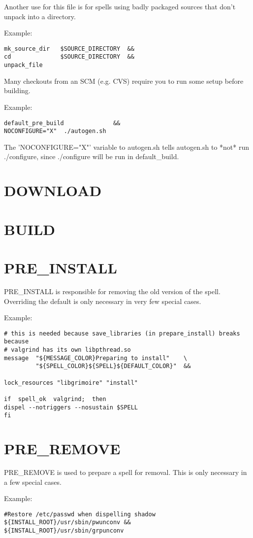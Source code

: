 \documentclass[a4paper,10pt]{book}
\begin{document}
Another use for this file is for spells using badly packaged sources that don't
unpack into a directory.

Example:
\begin{verbatim}
mk_source_dir   $SOURCE_DIRECTORY  &&
cd              $SOURCE_DIRECTORY  &&
unpack_file
\end{verbatim}

Many checkouts from an SCM (e.g. CVS) require you to run some setup before
building.

Example:
\begin{verbatim}
default_pre_build              &&
NOCONFIGURE="X"  ./autogen.sh
\end{verbatim}

The 'NOCONFIGURE="X"' variable to autogen.sh tells autogen.sh to *not* run
./configure, since ./configure will be run in default\_build.

\section{DOWNLOAD}

\section{BUILD}
\section{PRE\_INSTALL}
PRE\_INSTALL is responsible for removing the old version of the spell.
Overriding the default is only necessary in very few special cases.

Example:
\begin{verbatim}
# this is needed because save_libraries (in prepare_install) breaks because
# valgrind has its own libpthread.so
message  "${MESSAGE_COLOR}Preparing to install"    \
         "${SPELL_COLOR}${SPELL}${DEFAULT_COLOR}"  &&

lock_resources "libgrimoire" "install"

if  spell_ok  valgrind;  then
dispel --notriggers --nosustain $SPELL
fi
\end{verbatim}

\section{PRE\_REMOVE}
PRE\_REMOVE is used to prepare a spell for removal. This is only necessary in a
few special cases.

Example:
\begin{verbatim}
#Restore /etc/passwd when dispelling shadow
${INSTALL_ROOT}/usr/sbin/pwunconv &&
${INSTALL_ROOT}/usr/sbin/grpunconv
\end{verbatim}
\end{document}
